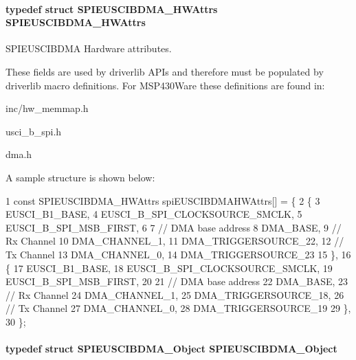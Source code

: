 \paragraph[{S\+P\+I\+E\+U\+S\+C\+I\+B\+D\+M\+A\+\_\+\+H\+W\+Attrs}]{\setlength{\rightskip}{0pt plus 5cm}typedef struct {\bf S\+P\+I\+E\+U\+S\+C\+I\+B\+D\+M\+A\+\_\+\+H\+W\+Attrs}  {\bf S\+P\+I\+E\+U\+S\+C\+I\+B\+D\+M\+A\+\_\+\+H\+W\+Attrs}}\label{_s_p_i_e_u_s_c_i_b_d_m_a_8h_a749c57472b0dd55a73f1cd1c6ef78927}


S\+P\+I\+E\+U\+S\+C\+I\+B\+D\+M\+A Hardware attributes. 

These fields are used by driverlib A\+P\+Is and therefore must be populated by driverlib macro definitions. For M\+S\+P430\+Ware these definitions are found in\+:
\begin{DoxyItemize}
\item inc/hw\+\_\+memmap.\+h
\item usci\+\_\+b\+\_\+spi.\+h
\item dma.\+h
\end{DoxyItemize}

A sample structure is shown below\+: 
\begin{DoxyCode}
1 const SPIEUSCIBDMA\_HWAttrs spiEUSCIBDMAHWAttrs[] = \{
2     \{
3         EUSCI\_B1\_BASE,
4         EUSCI\_B\_SPI\_CLOCKSOURCE\_SMCLK,
5         EUSCI\_B\_SPI\_MSB\_FIRST,
6 
7         // DMA base address
8         DMA\_BASE,
9         // Rx Channel
10         DMA\_CHANNEL\_1,
11         DMA\_TRIGGERSOURCE\_22,
12         // Tx Channel
13         DMA\_CHANNEL\_0,
14         DMA\_TRIGGERSOURCE\_23
15     \},
16     \{
17         EUSCI\_B1\_BASE,
18         EUSCI\_B\_SPI\_CLOCKSOURCE\_SMCLK,
19         EUSCI\_B\_SPI\_MSB\_FIRST,
20 
21         // DMA base address
22         DMA\_BASE,
23         // Rx Channel
24         DMA\_CHANNEL\_1,
25         DMA\_TRIGGERSOURCE\_18,
26         // Tx Channel
27         DMA\_CHANNEL\_0,
28         DMA\_TRIGGERSOURCE\_19
29     \},
30 \};
\end{DoxyCode}
\paragraph[{S\+P\+I\+E\+U\+S\+C\+I\+B\+D\+M\+A\+\_\+\+Object}]{\setlength{\rightskip}{0pt plus 5cm}typedef struct {\bf S\+P\+I\+E\+U\+S\+C\+I\+B\+D\+M\+A\+\_\+\+Object}  {\bf S\+P\+I\+E\+U\+S\+C\+I\+B\+D\+M\+A\+\_\+\+Object}}\label{_s_p_i_e_u_s_c_i_b_d_m_a_8h_a2ec8ab315cc978ab2308a24ba6b6f82f}


